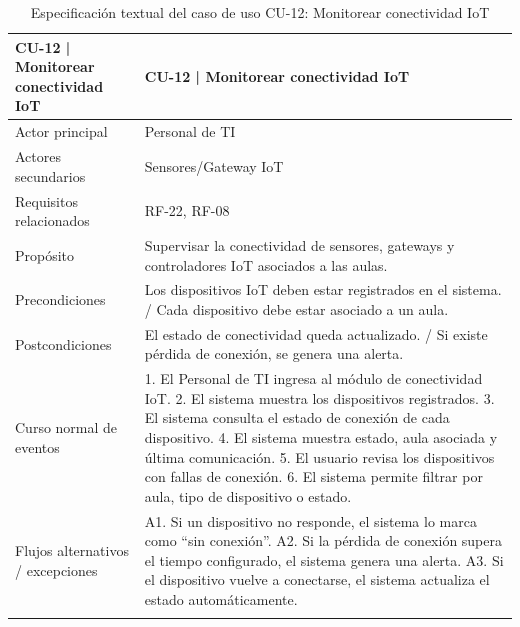 \begingroup
\small
\begin{longtable}{|P{0.5000}|P{0.5000}|}
\hline
CU-12 | Monitorear conectividad IoT & CU-12 | Monitorear conectividad IoT \\ \hline
Actor principal & Personal de TI \\ \hline
Actores secundarios & Sensores/Gateway IoT \\ \hline
Requisitos relacionados & RF-22, RF-08 \\ \hline
Propósito & Supervisar la conectividad de sensores, gateways y controladores IoT asociados a las aulas. \\ \hline
Precondiciones & Los dispositivos IoT deben estar registrados en el sistema. / Cada dispositivo debe estar asociado a un aula. \\ \hline
Postcondiciones & El estado de conectividad queda actualizado. / Si existe pérdida de conexión, se genera una alerta. \\ \hline
Curso normal de eventos & 1. El Personal de TI ingresa al módulo de conectividad IoT. 2. El sistema muestra los dispositivos registrados. 3. El sistema consulta el estado de conexión de cada dispositivo. 4. El sistema muestra estado, aula asociada y última comunicación. 5. El usuario revisa los dispositivos con fallas de conexión. 6. El sistema permite filtrar por aula, tipo de dispositivo o estado. \\ \hline
Flujos alternativos / excepciones & A1. Si un dispositivo no responde, el sistema lo marca como ``sin conexión''. A2. Si la pérdida de conexión supera el tiempo configurado, el sistema genera una alerta. A3. Si el dispositivo vuelve a conectarse, el sistema actualiza el estado automáticamente. \\ \hline
\caption{Especificación textual del caso de uso CU-12: Monitorear conectividad IoT}
\end{longtable}
\endgroup

